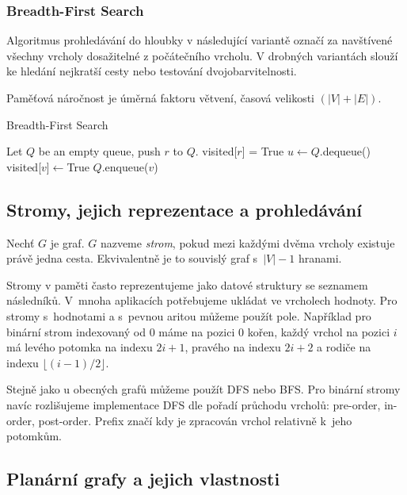 \subsubsection*{Breadth-First Search}

Algoritmus prohledávání do hloubky v následující variantě označí za
navštívené všechny vrcholy dosažitelné z počátečního vrcholu. V drobných
variantách slouží ke hledání nejkratší cesty nebo testování
dvojobarvitelnosti.

Paměťová náročnost je úměrná faktoru větvení, časová velikosti
$(\lvert V \rvert + \lvert E \rvert)$.

\begin{algorithm}
\caption{Breadth-First Search}
\begin{algorithmic}[1]
    \State Let $Q$ be an empty queue, push $r$ to $Q$.
    \State visited[$r$] = True
        \State $u \gets Q$.dequeue()
                \State visited[$v$]$ \gets $True
                \State $Q$.enqueue($v$)
            \EndIf
        \EndFor
    \EndWhile
\EndFunction
\end{algorithmic}
\end{algorithm}


\subsection{Stromy, jejich reprezentace a prohledávání}

Nechť $G$ je graf. $G$ nazveme {\em strom}, pokud mezi každými dvěma
vrcholy existuje právě jedna cesta. Ekvivalentně je to souvislý graf
s~$\lvert V \rvert - 1$ hranami.

Stromy v paměti často reprezentujeme jako datové struktury se seznamem
následníků. V~mnoha aplikacích potřebujeme ukládat ve vrcholech hodnoty.
Pro stromy s~hodnotami a s~pevnou aritou můžeme použít pole.
Například pro binární strom indexovaný od 0 máme na pozici $0$ kořen,
každý vrchol na pozici $i$ má levého potomka na indexu $2i+1$, pravého
na indexu $2i+2$ a rodiče na indexu $\lfloor (i - 1) / 2 \rfloor$.

Stejně jako u obecných grafů můžeme použít DFS nebo BFS. Pro binární
stromy navíc rozlišujeme implementace DFS dle pořadí průchodu vrcholů:
pre-order, in-order, post-order. Prefix značí kdy je zpracován vrchol
relativně k~jeho potomkům.

\subsection{Planární grafy a jejich vlastnosti}

